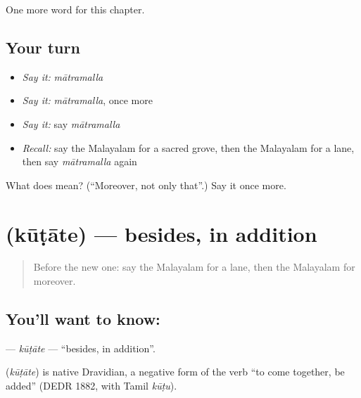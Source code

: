 \begin{grammarlens}[title={What you've built}]
One more word for this chapter.
\end{grammarlens}

\subsection*{Your turn}
\begin{itemize}
\raggedright
  \item \emph{Say it:} \emph{mātramalla}
  \item \emph{Say it:} \emph{mātramalla}, once more
  \item \emph{Say it:} say \emph{mātramalla}
  \item \emph{Recall:} say the Malayalam for a sacred grove, then the Malayalam for a lane, then say \emph{mātramalla} again
\end{itemize}

\begin{tcolorbox}[breakable,colback=teal!4,colframe=teal!35!black,title={Before you move on}]
What does  mean? (\textquotedblleft{}Moreover, not only that\textquotedblright{}.) Say it once more.
\end{tcolorbox}
\section[\texorpdfstring{\ml{കൂടാതെ} (kūṭāte)}{കൂടാതെ (kūṭāte)}]{ (kūṭāte) — besides, in addition}

\label{lesson:ML-C281-kutate}



\begin{quote}
Before the new one: say the Malayalam for a lane, then the Malayalam for moreover.
\end{quote}

\subsection*{You'll want to know: }
\textbf{} — \emph{kūṭāte} — \textquotedblleft{}besides, in addition\textquotedblright{}.

\begin{cousinweb}
\textbf{} (\emph{kūṭāte}) is native Dravidian, a negative form of the verb \textquotedblleft{}to come together, be added\textquotedblright{} (DEDR 1882, with Tamil \emph{kūṭu}).
\end{cousinweb}

